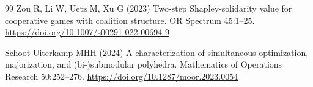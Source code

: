 \documentclass[11pt]{article}
\begin{document}
{\begin{thebibliography}{99}
Zou R, Li W, Uetz M, Xu G (2023) Two-step Shapley-solidarity value for
cooperative games with coalition structure. OR Spectrum 45:1--25.
\url{https://doi.org/10.1007/s00291-022-00694-9}

Schoot Uiterkamp MHH (2024) A characterization of simultaneous optimization,
majorization, and (bi-)submodular polyhedra. Mathematics of Operations
Research 50:252--276.
\url{https://doi.org/10.1287/moor.2023.0054}

\end{thebibliography}
}
\end{document}

